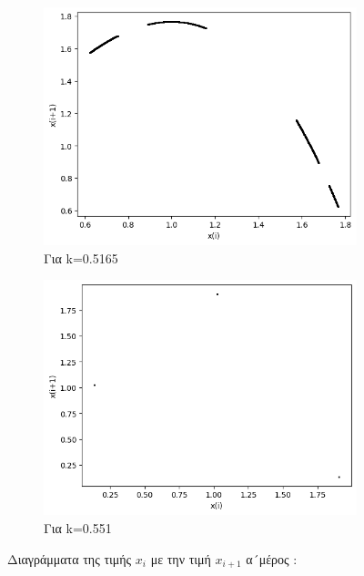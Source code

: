 \begin{figure}[h!]
\begin{subfigure}[b]{0.4\textwidth}
		\includegraphics[width=\textwidth]{LateX images/graphs q03/g67}
		\caption{Για k=0.5165}
		\label{f:k19}
	\end{subfigure}
	\hfill
	\begin{subfigure}[b]{0.4\textwidth}
		\centering
		\includegraphics[width=\textwidth]{LateX images/graphs q03/g8}
		\caption{Για k=0.551}
		\label{f:k20}
	\end{subfigure}
	\hfill
\caption{Διαγράμματα της τιμής \(x_i\) με την τιμή \(x_{i+1}\) α´μέρος :}	
\end{figure}
